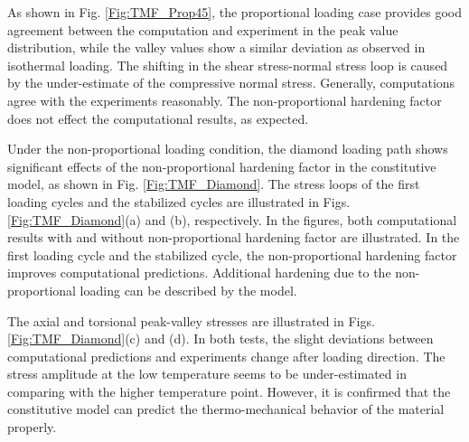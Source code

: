 \documentclass[preprint,5p,twocolumn,11pt,sort&compress]{elsarticle}
\begin{document}
As shown in Fig. \ref{Fig:TMF_Prop45}, the proportional loading case provides good agreement between the computation and experiment in the peak value distribution, while the valley values show a similar deviation as observed in isothermal loading. The shifting in the shear stress-normal stress loop is caused by the under-estimate of the compressive normal stress. Generally, computations agree with the experiments reasonably. The non-proportional hardening factor does not effect the computational results, as expected.

Under the non-proportional loading condition, the diamond loading path shows significant effects of the non-proportional hardening factor in the constitutive model, as shown in Fig. \ref{Fig:TMF_Diamond}. The stress loops of the first loading cycles and the stabilized cycles are illustrated in Figs. \ref{Fig:TMF_Diamond}(a) and (b), respectively. In the figures, both computational results with and without non-proportional hardening factor are illustrated. In the first loading cycle and the stabilized cycle, the non-proportional hardening factor improves computational predictions. Additional hardening due to the non-proportional loading can be described by the model.

The axial and torsional peak-valley stresses are illustrated in  Figs. \ref{Fig:TMF_Diamond}(c) and (d).
In both tests, the slight deviations between computational predictions and experiments  change after loading direction. The stress amplitude at the low temperature seems to be under-estimated in comparing with the higher temperature point. However, it is confirmed that the constitutive model can predict the thermo-mechanical behavior of the material properly.

\end{document}
